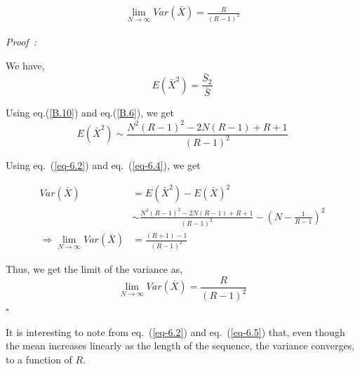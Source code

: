\begin{multicols}{2}
\vspace{-.7cm}

\begin{eqnarray*}
\lim_{N \rightarrow \infty} Var(\bar{X}) = \frac{R}{(R -1)^2}
\end{eqnarray*}

\vspace{-.4cm}

\noindent
{\it Proof~:}

We have,
\begin{equation}
E(\bar{X}^2) = \frac{\bar{S}_2}{\bar{S}}\label{eq-6.3}
\end{equation}

\vspace{-.2cm}

Using eq.(\ref{B.10}) and eq.(\ref{B.6}), we get
\begin{equation}
E(\bar{X}^2) \sim \frac{N^2(R-1)^2 - 2N(R-1) + R+1}{(R-1)^2}\label{eq-6.4}
\end{equation}

\vspace{-.3cm}

Using eq.~(\ref{eq-6.2}) and eq.~(\ref{eq-6.4}), we get

\vspace{-.3cm}

{\fontsize{8}{9}\selectfont\begin{align*}
Var(\bar{X})&= E(\bar{X}^2)-E(\bar{X})^2\nonumber \\
&\sim \frac{N^2(R-1)^2 - 2N(R-1) + R+1}{(R-1)^2}-\left(N - \frac{1}{R-1}\right)^2\nonumber\\
\Rightarrow \lim_{N \rightarrow \infty}Var(\bar{X})& =  \frac{(R+1)-1}{(R-1)^2}\nonumber
\end{align*}}

\vspace{-.3cm}

Thus, we get the limit of the variance as,
\begin{equation}
\lim_{N \rightarrow \infty}Var(\bar{X}) = \frac{R}{(R-1)^2}\label{eq-6.5}
\end{equation}
\hfill{$\square$\\}

\vspace{-1cm}

It is interesting to note from eq.~(\ref{eq-6.2}) and eq.~(\ref{eq-6.5}) that, even though the mean increases linearly as the length of the sequence, the variance converges, to a function of $R$.


\end{multicols}
